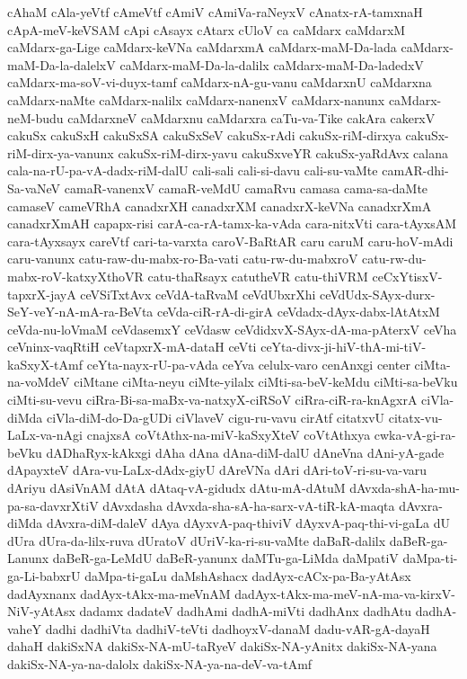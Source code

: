 {cAhaM
cAla-yeVtf
cAmeVtf
cAmiV
cAmiVa-raNeyxV
cAnatx-rA-tamxnaH
cApA-meV-keVSAM
cApi
cAsayx
cAtarx
cUloV
ca
caMdarx
caMdarxM
caMdarx-ga-Lige
caMdarx-keVNa
caMdarxmA
caMdarx-maM-Da-lada
caMdarx-maM-Da-la-dalelxV
caMdarx-maM-Da-la-dalilx
caMdarx-maM-Da-ladedxV
caMdarx-ma-soV-vi-duyx-tamf
caMdarx-nA-gu-vanu
caMdarxnU
caMdarxna
caMdarx-naMte
caMdarx-nalilx
caMdarx-nanenxV
caMdarx-nanunx
caMdarx-neM-budu
caMdarxneV
caMdarxnu
caMdarxra
caTu-va-Tike
cakAra
cakerxV
cakuSx
cakuSxH
cakuSxSA
cakuSxSeV
cakuSx-rAdi
cakuSx-riM-dirxya
cakuSx-riM-dirx-ya-vanunx
cakuSx-riM-dirx-yavu
cakuSxveYR
cakuSx-yaRdAvx
calana
cala-na-rU-pa-vA-dadx-riM-dalU
cali-sali
cali-si-davu
cali-su-vaMte
camAR-dhi-Sa-vaNeV
camaR-vanenxV
camaR-veMdU
camaRvu
camasa
cama-sa-daMte
camaseV
cameVRhA
canadxrXH
canadxrXM
canadxrX-keVNa
canadxrXmA
canadxrXmAH
capapx-risi
carA-ca-rA-tamx-ka-vAda
cara-nitxVti
cara-tAyxsAM
cara-tAyxsayx
careVtf
cari-ta-varxta
caroV-BaRtAR
caru
caruM
caru-hoV-mAdi
caru-vanunx
catu-raw-du-mabx-ro-Ba-vati
catu-rw-du-mabxroV
catu-rw-du-mabx-roV-katxyXthoVR
catu-thaRsayx
catutheVR
catu-thiVRM
ceCxYtisxV-tapxrX-jayA
ceVSiTxtAvx
ceVdA-taRvaM
ceVdUbxrXhi
ceVdUdx-SAyx-durx-SeY-veY-nA-mA-ra-BeVta
ceVda-ciR-rA-di-girA
ceVdadx-dAyx-dabx-lAtAtxM
ceVda-nu-loVmaM
ceVdasemxY
ceVdasw
ceVdidxvX-SAyx-dA-ma-pAterxV
ceVha
ceVninx-vaqRtiH
ceVtapxrX-mA-dataH
ceVti
ceYta-divx-ji-hiV-thA-mi-tiV-kaSxyX-tAmf
ceYta-nayx-rU-pa-vAda
ceYva
celulx-varo
cenAnxgi
center
ciMta-na-voMdeV
ciMtane
ciMta-neyu
ciMte-yilalx
ciMti-sa-beV-keMdu
ciMti-sa-beVku
ciMti-su-vevu
ciRra-Bi-sa-maBx-va-natxyX-ciRSoV
ciRra-ciR-ra-knAgxrA
ciVla-diMda
ciVla-diM-do-Da-gUDi
ciVlaveV
cigu-ru-vavu
cirAtf
citatxvU
citatx-vu-LaLx-va-nAgi
cnajxsA
coVtAthx-na-miV-kaSxyXteV
coVtAthxya
cwka-vA-gi-ra-beVku
dADhaRyx-kAkxgi
dAha
dAna
dAna-diM-dalU
dAneVna
dAni-yA-gade
dApayxteV
dAra-vu-LaLx-dAdx-giyU
dAreVNa
dAri
dAri-toV-ri-su-va-varu
dAriyu
dAsiVnAM
dAtA
dAtaq-vA-gidudx
dAtu-mA-dAtuM
dAvxda-shA-ha-mu-pa-sa-davxrXtiV
dAvxdasha
dAvxda-sha-sA-ha-sarx-vA-tiR-kA-maqta
dAvxra-diMda
dAvxra-diM-daleV
dAya
dAyxvA-paq-thiviV
dAyxvA-paq-thi-vi-gaLa
dU
dUra
dUra-da-lilx-ruva
dUratoV
dUriV-ka-ri-su-vaMte
daBaR-dalilx
daBeR-ga-Lanunx
daBeR-ga-LeMdU
daBeR-yanunx
daMTu-ga-LiMda
daMpatiV
daMpa-ti-ga-Li-babxrU
daMpa-ti-gaLu
daMshAshacx
dadAyx-cACx-pa-Ba-yAtAsx
dadAyxnanx
dadAyx-tAkx-ma-meVnAM
dadAyx-tAkx-ma-meV-nA-ma-va-kirxV-NiV-yAtAsx
dadamx
dadateV
dadhAmi
dadhA-miVti
dadhAnx
dadhAtu
dadhA-vaheY
dadhi
dadhiVta
dadhiV-teVti
dadhoyxV-danaM
dadu-vAR-gA-dayaH
dahaH
dakiSxNA
dakiSx-NA-mU-taRyeV
dakiSx-NA-yAnitx
dakiSx-NA-yana
dakiSx-NA-ya-na-dalolx
dakiSx-NA-ya-na-deV-va-tAmf
}
